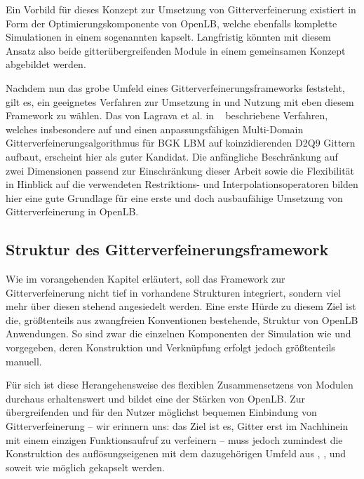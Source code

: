 Ein Vorbild für dieses Konzept zur Umsetzung von Gitterverfeinerung existiert in Form der Optimierungskomponente von OpenLB, welche ebenfalls komplette Simulationen in einem sogenannten  kapselt. Langfristig könnten mit diesem Ansatz also beide gitterübergreifenden Module in einem gemeinsamen Konzept abgebildet werden.

\bigskip
Nachdem nun das grobe Umfeld eines Gitterverfeinerungsframeworks feststeht, gilt es, ein geeignetes Verfahren zur Umsetzung in und Nutzung mit eben diesem Framework zu wählen. Das von Lagrava et al. in ~\cite{lagrava12} beschriebene Verfahren, welches insbesondere auf \cite{dupuisChopard03} und \cite{filippova98} einen anpassungsfähigen Multi-Domain Gitterverfeinerungsalgorithmus für BGK LBM auf koinzidierenden D2Q9 Gittern aufbaut, erscheint hier als guter Kandidat. Die anfängliche Beschränkung auf zwei Dimensionen passend zur Einschränkung dieser Arbeit sowie die Flexibilität in Hinblick auf die verwendeten Restriktions- und Interpolationsoperatoren bilden hier eine gute Grundlage für eine erste und doch ausbaufähige Umsetzung von Gitterverfeinerung in OpenLB.

\newpage
\subsection{Struktur des Gitterverfeinerungsframework}

Wie im vorangehenden Kapitel erläutert, soll das Framework zur Gitterverfeinerung nicht tief in vorhandene Strukturen integriert, sondern viel mehr über diesen stehend angesiedelt werden. Eine erste Hürde zu diesem Ziel ist die, größtenteils aus zwangfreien Konventionen bestehende, Struktur von OpenLB Anwendungen. So sind zwar die einzelnen Komponenten der Simulation wie  und  vorgegeben, deren Konstruktion und Verknüpfung erfolgt jedoch größtenteils manuell.

Für sich ist diese Herangehensweise des flexiblen Zusammensetzens von Modulen durchaus erhaltenswert und bildet eine der Stärken von OpenLB. Zur übergreifenden und für den Nutzer möglichst bequemen Einbindung von Gitterverfeinerung -- wir erinnern uns: das Ziel ist es, Gitter erst im Nachhinein mit einem einzigen Funktionsaufruf zu verfeinern -- muss jedoch zumindest die Konstruktion des auflösungseigenen  mit dem dazugehörigen Umfeld aus , ,  und  soweit wie möglich gekapselt werden.

